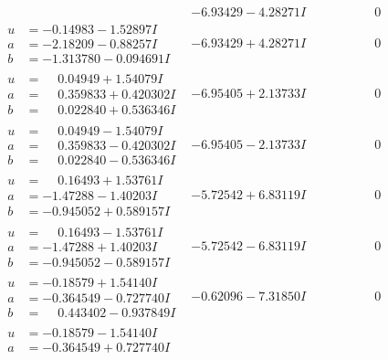 \documentclass[1p]{elsarticle_modified}
\theoremstyle{definition}
\begin{document}
$$\begin{array}{c|c|c}
 & -6.93429 - 4.28271 I & \phantom{-0.000000 } 0 \\ \hline\begin{aligned}
u &= -0.14983 - 1.52897 I \\
a &= -2.18209 - 0.88257 I \\
b &= -1.313780 - 0.094691 I\end{aligned}
 & -6.93429 + 4.28271 I & \phantom{-0.000000 } 0 \\ \hline\begin{aligned}
u &= \phantom{-}0.04949 + 1.54079 I \\
a &= \phantom{-}0.359833 + 0.420302 I \\
b &= \phantom{-}0.022840 + 0.536346 I\end{aligned}
 & -6.95405 + 2.13733 I & \phantom{-0.000000 } 0 \\ \hline\begin{aligned}
u &= \phantom{-}0.04949 - 1.54079 I \\
a &= \phantom{-}0.359833 - 0.420302 I \\
b &= \phantom{-}0.022840 - 0.536346 I\end{aligned}
 & -6.95405 - 2.13733 I & \phantom{-0.000000 } 0 \\ \hline\begin{aligned}
u &= \phantom{-}0.16493 + 1.53761 I \\
a &= -1.47288 - 1.40203 I \\
b &= -0.945052 + 0.589157 I\end{aligned}
 & -5.72542 + 6.83119 I & \phantom{-0.000000 } 0 \\ \hline\begin{aligned}
u &= \phantom{-}0.16493 - 1.53761 I \\
a &= -1.47288 + 1.40203 I \\
b &= -0.945052 - 0.589157 I\end{aligned}
 & -5.72542 - 6.83119 I & \phantom{-0.000000 } 0 \\ \hline\begin{aligned}
u &= -0.18579 + 1.54140 I \\
a &= -0.364549 - 0.727740 I \\
b &= \phantom{-}0.443402 - 0.937849 I\end{aligned}
 & -0.62096 - 7.31850 I & \phantom{-0.000000 } 0 \\ \hline\begin{aligned}
u &= -0.18579 - 1.54140 I \\
a &= -0.364549 + 0.727740 I \\

\end{aligned}
\end{array}$$
\end{document}
